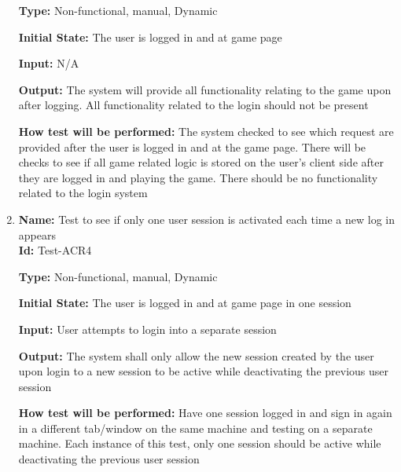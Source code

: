 \documentclass[12pt, titlepage]{article}
\begin{document}
\begin{enumerate}
    \textbf{Type:} Non-functional, manual, Dynamic
    					
    \textbf{Initial State:} The user is logged in and at game page
    					
    \textbf{Input:} N/A
    					
    \textbf{Output:} The system will provide all functionality relating to the game upon after logging. All functionality related to the login should not be present 
    					
    \textbf{How test will be performed:} The system checked to see which request are provided after the user is logged in and at the game page. There will be checks to see if all game related logic is stored on the user's client side after they are logged in and playing the game. There should be no functionality related to the login system 
    
    \item{\textbf{Name:} Test to see if only one user session is activated each time a new log in appears\\} \label{Test-ACR4}
    \textbf{Id: }Test-ACR4
    
    \textbf{Type:} Non-functional, manual, Dynamic
    					
    \textbf{Initial State:} The user is logged in and at game page in one session
    					
    \textbf{Input:} User attempts to login into a separate session
    					
    \textbf{Output:} The system shall only allow the new session created by the user upon login to a new session to be active while deactivating the previous user session
    					
    \textbf{How test will be performed:} Have one session logged in and sign in again in a different tab/window on the same machine and testing on a separate machine. Each instance of this test, only one session should be active while deactivating the previous user session 
    
\end{enumerate}
\end{document}
